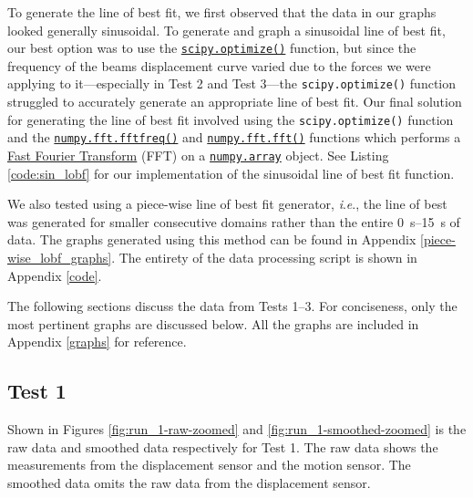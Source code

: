 \documentclass[12 pt]{report}
\newcommand{\ie}{\textit{i}.\textit{e}., }
\begin{document}
To generate the line of best fit, we first observed that the data in our graphs looked generally sinusoidal. To generate and graph a sinusoidal line of best fit, our best option was to use the \href{https://docs.scipy.org/doc/scipy/tutorial/optimize.html}{\texttt{scipy.optimize()}} function, but since the frequency of the beams displacement curve varied due to the forces we were applying to it---especially in Test \num{2} and Test \num{3}---the \texttt{scipy.optimize()} function struggled to accurately generate an appropriate line of best fit. Our final solution for generating the line of best fit involved using the \texttt{scipy.optimize()} function and the \href{https://numpy.org/doc/stable/reference/generated/numpy.fft.fftfreq.html}{\texttt{numpy.fft.fftfreq()}} and \href{https://numpy.org/doc/stable/reference/generated/numpy.fft.fft.html}{\texttt{numpy.fft.fft()}} functions which performs a \href{https://en.wikipedia.org/wiki/Fast_Fourier_transform}{Fast Fourier Transform} (FFT) on a \href{https://numpy.org/doc/stable/reference/generated/numpy.array.html}{\texttt{numpy.array}} object. See Listing \ref{code:sin_lobf} for our implementation of the sinusoidal line of best fit function.



We also tested using a piece-wise line of best fit generator, \ie the line of best was generated for smaller consecutive domains rather than the entire \qtyrange{0}{15}{\s} of data. The graphs generated using this method can be found in Appendix \ref{piece-wise_lobf_graphs}. The entirety of the data processing script is shown in Appendix \ref{code}.

The following sections discuss the data from Tests \num{1}--\num{3}. For conciseness, only the most pertinent graphs are discussed below. All the graphs are included in Appendix \ref{graphs} for reference.

\subsection{Test 1} \label{data-test_1}
Shown in Figures \ref{fig:run_1-raw-zoomed} and \ref{fig:run_1-smoothed-zoomed} is the raw data and smoothed data respectively for Test \num{1}. The raw data shows the measurements from the displacement sensor and the motion sensor. The smoothed data omits the raw data from the displacement sensor.
\end{document}
